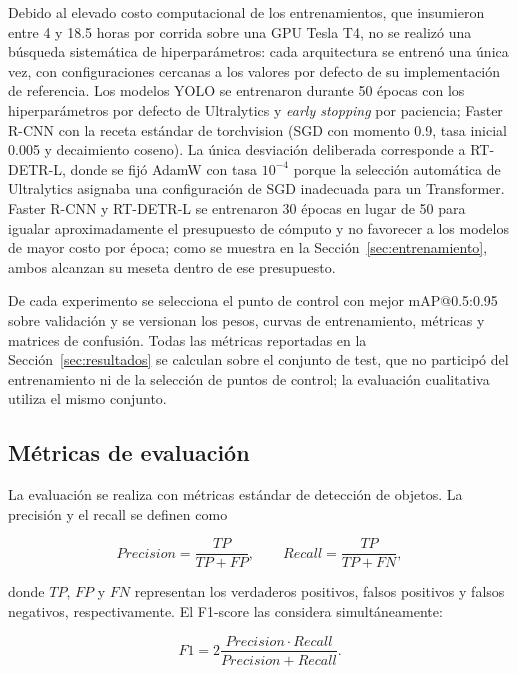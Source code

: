 \documentclass[conference]{IEEEtran}
\begin{document}
Debido al elevado costo computacional de los entrenamientos, que insumieron
entre 4 y 18.5 horas por corrida sobre una GPU Tesla T4, no se realizó una
búsqueda sistemática de hiperparámetros: cada arquitectura se entrenó una
única vez, con configuraciones cercanas a los valores por defecto de su
implementación de referencia. Los modelos YOLO se entrenaron durante 50
épocas con los hiperparámetros por defecto de Ultralytics y \textit{early
stopping} por paciencia; Faster R-CNN con la receta estándar de torchvision
(SGD con momento 0.9, tasa inicial 0.005 y decaimiento coseno). La única
desviación deliberada corresponde a RT-DETR-L, donde se fijó AdamW con tasa
$10^{-4}$ porque la selección automática de Ultralytics asignaba una
configuración de SGD inadecuada para un Transformer. Faster R-CNN y
RT-DETR-L se entrenaron 30 épocas en lugar de 50 para igualar
aproximadamente el presupuesto de cómputo y no favorecer a los modelos de
mayor costo por época; como se muestra en la
Sección~\ref{sec:entrenamiento}, ambos alcanzan su meseta dentro de ese
presupuesto.

De cada experimento se selecciona el punto de control con mejor mAP@0.5:0.95
sobre validación y se versionan los pesos, curvas de entrenamiento, métricas
y matrices de confusión. Todas las métricas reportadas en la
Sección~\ref{sec:resultados} se calculan sobre el conjunto de test, que no
participó del entrenamiento ni de la selección de puntos de control; la
evaluación cualitativa utiliza el mismo conjunto.



\subsection{Métricas de evaluación}

La evaluación se realiza con métricas estándar de detección de objetos. La
precisión y el recall se definen como

\begin{equation}
Precision = \frac{TP}{TP+FP}, \qquad
Recall = \frac{TP}{TP+FN},
\label{eq:precision_recall}
\end{equation}

donde $TP$, $FP$ y $FN$ representan los verdaderos positivos, falsos
positivos y falsos negativos, respectivamente. El F1-score las considera
simultáneamente:

\begin{equation}
F1 =
2
\frac{Precision \cdot Recall}
{Precision + Recall}.
\label{eq:f1}
\end{equation}
\end{document}

